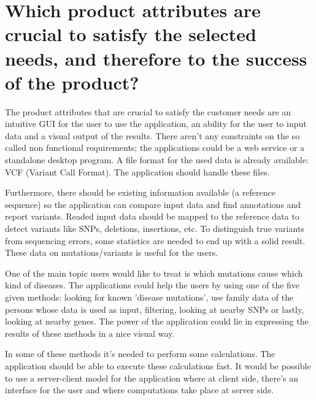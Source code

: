 \section{Which product attributes are crucial to satisfy the selected needs, and therefore to the success of the product?}
The product attributes that are crucial to satisfy the customer needs are an intuitive GUI for the user to use the application, an ability for the user to input data and a visual output of the results. There aren't any constraints on the so called non functional requirements; the applications could be a web service or a standalone desktop program. A file format for the used data is already available: VCF (Variant Call Format). The application should handle these files.

Furthermore, there should be existing information available (a reference sequence) so the application can compare input data and find annotations and report variants. Readed input data should be mapped to the reference data to detect variants like SNPs, deletions, insertions, etc. To distinguish true variants from sequencing errors, some statistics are needed to end up with a solid result. These data on mutations/variants is useful for the users.

One of the main topic users would like to treat is which mutations cause which kind of diseases. The applications could help the users by using one of the five given methods: looking for known 'disease mutations', use family data of the persons whose data is used as input, filtering, looking at nearby SNPs or lastly, looking at nearby genes. The power of the application could lie in expressing the results of these methods in a nice visual way.

In some of these methods it's needed to perform some calculations. The application should be able to execute these calculations fast. It would be possible to use a server-client model for the application where at client side, there's an interface for the user and where computations take place at server side.